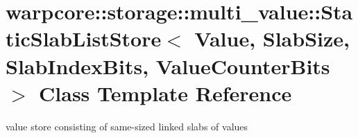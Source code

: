 \hypertarget{classwarpcore_1_1storage_1_1multi__value_1_1StaticSlabListStore}{}\section{warpcore\+:\+:storage\+:\+:multi\+\_\+value\+:\+:Static\+Slab\+List\+Store$<$ Value, Slab\+Size, Slab\+Index\+Bits, Value\+Counter\+Bits $>$ Class Template Reference}
\label{classwarpcore_1_1storage_1_1multi__value_1_1StaticSlabListStore}


value store consisting of same-\/sized linked slabs of values  


